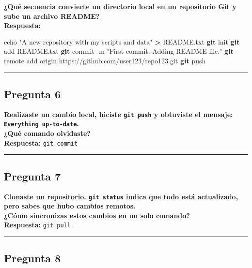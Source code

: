 \documentclass[
]{article}
\newenvironment{Shaded}{\begin{snugshade}}{\end{snugshade}}
\newcommand{\AttributeTok}[1]{\textcolor[rgb]{0.13,0.29,0.53}{#1}}
\newcommand{\BuiltInTok}[1]{#1}
\newcommand{\FunctionTok}[1]{\textcolor[rgb]{0.13,0.29,0.53}{\textbf{#1}}}
\newcommand{\NormalTok}[1]{#1}
\newcommand{\OperatorTok}[1]{\textcolor[rgb]{0.81,0.36,0.00}{\textbf{#1}}}
\newcommand{\StringTok}[1]{\textcolor[rgb]{0.31,0.60,0.02}{#1}}
\begin{document}
\textbf{¿Qué secuencia convierte un directorio local en un repositorio
Git y sube un archivo README?}\\
\textbf{Respuesta:}

\begin{Shaded}
\begin{Highlighting}[]
\BuiltInTok{echo} \StringTok{"A new repository with my scripts and data"} \OperatorTok{\textgreater{}}\NormalTok{ README.txt}
\FunctionTok{git}\NormalTok{ init}
\FunctionTok{git}\NormalTok{ add README.txt}
\FunctionTok{git}\NormalTok{ commit }\AttributeTok{{-}m} \StringTok{"First commit. Adding README file."}
\FunctionTok{git}\NormalTok{ remote add origin https://github.com/user123/repo123.git}
\FunctionTok{git}\NormalTok{ push}
\end{Highlighting}
\end{Shaded}

\begin{center}\rule{0.5\linewidth}{0.5pt}\end{center}

\subsection{Pregunta 6}\label{pregunta-6}

\textbf{Realizaste un cambio local, hiciste \texttt{git\ push} y
obtuviste el mensaje: \texttt{Everything\ up-to-date}.}\\
\textbf{¿Qué comando olvidaste?}\\
\textbf{Respuesta:} \texttt{git\ commit}

\begin{center}\rule{0.5\linewidth}{0.5pt}\end{center}

\subsection{Pregunta 7}\label{pregunta-7}

\textbf{Clonaste un repositorio. \texttt{git\ status} indica que todo
está actualizado, pero sabes que hubo cambios remotos.}\\
\textbf{¿Cómo sincronizas estos cambios en un solo comando?}\\
\textbf{Respuesta:} \texttt{git\ pull}

\begin{center}\rule{0.5\linewidth}{0.5pt}\end{center}

\subsection{Pregunta 8}\label{pregunta-8}
\end{document}
